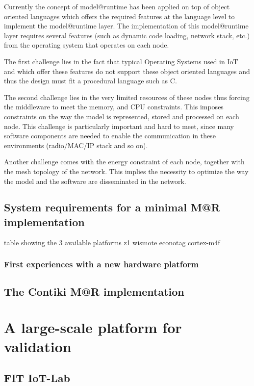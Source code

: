 Currently the concept of model@runtime has been applied on top of object oriented languages which offers the required features at the language level to implement the model@runtime layer. 
The implementation of this model@runtime layer requires several features (such as dynamic code loading, network stack, etc.) from the operating system that operates on each node.

The first challenge lies in the fact that typical Operating Systems used in IoT and which offer these features do not support these object oriented languages and thus the design must fit a procedural language such as C.

The second challenge lies in the very limited resources of these nodes thus forcing the middleware to meet the memory, and CPU constraints. 
This imposes constraints on the way the model is represented, stored and processed on each node.
This challenge is particularly important and hard to meet, since many software components are needed to enable the communication in these environments (radio/MAC/IP stack and so on).

Another challenge comes with the energy constraint of each node, together with the mesh topology of the network.
This implies the necessity to optimize the way the model and the software are disseminated in the network.


\subsection{System requirements for a minimal M@R implementation}
table showing the 3 available platforms z1 wismote econotag cortex-m4f

\subsubsection{First experiences with a new hardware platform}

\subsection{The Contiki M@R implementation}

\section{A large-scale platform for validation}

\subsection{FIT IoT-Lab}

